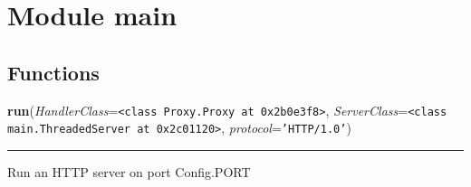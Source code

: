 %
%
%


\section{Module main}

    \label{main}


  \subsection{Functions}

    \label{main:run}

    \vspace{0.5ex}

\hspace{.8\funcindent}\begin{boxedminipage}{\funcwidth}

    \raggedright \textbf{run}(\textit{HandlerClass}={\tt {\textless}class Proxy.Proxy at 0x2b0e3f8{\textgreater}}, \textit{ServerClass}={\tt {\textless}class main.ThreadedServer at 0x2c01120{\textgreater}}, \textit{protocol}={\tt \texttt{'}\texttt{HTTP/1.0}\texttt{'}})

    \vspace{-1.5ex}

    \rule{\textwidth}{0.5\fboxrule}
\setlength{\parskip}{2ex}
    Run an HTTP server on port Config.PORT

\setlength{\parskip}{1ex}
    \end{boxedminipage}



